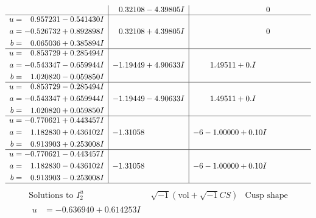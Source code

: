\documentclass[1p]{elsarticle_modified}
\theoremstyle{definition}
\newcommand{\I}{\sqrt{-1}}
\begin{document}
$$\begin{array}{c|c|c}
 & \phantom{-}0.32108 - 4.39805 I & \phantom{-0.000000 } 0 \\ \hline\begin{aligned}
u &= \phantom{-}0.957231 - 0.541430 I \\
a &= -0.526732 + 0.892898 I \\
b &= \phantom{-}0.065036 + 0.385894 I\end{aligned}
 & \phantom{-}0.32108 + 4.39805 I & \phantom{-0.000000 } 0 \\ \hline\begin{aligned}
u &= \phantom{-}0.853729 + 0.285494 I \\
a &= -0.543347 - 0.659944 I \\
b &= \phantom{-}1.020820 - 0.059850 I\end{aligned}
 & -1.19449 + 4.90633 I & \phantom{-}1.49511 + 0. I\phantom{ +0.000000I} \\ \hline\begin{aligned}
u &= \phantom{-}0.853729 - 0.285494 I \\
a &= -0.543347 + 0.659944 I \\
b &= \phantom{-}1.020820 + 0.059850 I\end{aligned}
 & -1.19449 - 4.90633 I & \phantom{-}1.49511 + 0. I\phantom{ +0.000000I} \\ \hline\begin{aligned}
u &= -0.770621 + 0.443457 I \\
a &= \phantom{-}1.182830 + 0.436102 I \\
b &= \phantom{-}0.913903 + 0.253008 I\end{aligned}
 & -1.31058\phantom{ +0.000000I} &                 -6
-1.00000 + 0. 10   I\phantom{ +0.000000I} \\ \hline\begin{aligned}
u &= -0.770621 - 0.443457 I \\
a &= \phantom{-}1.182830 - 0.436102 I \\
b &= \phantom{-}0.913903 - 0.253008 I\end{aligned}
 & -1.31058\phantom{ +0.000000I} &                 -6
-1.00000 + 0. 10   I\phantom{ +0.000000I}\\
 \hline 
 \end{array}$$\newpage$$\begin{array}{c|c|c}  
\text{Solutions to }I^u_{2}& \I (\text{vol} + \sqrt{-1}CS) & \text{Cusp shape}\\
 \hline 
\begin{aligned}
u &= -0.636940 + 0.614253 I \\

\end{aligned}
\end{array}$$
\end{document}
